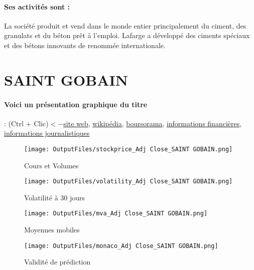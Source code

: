 \documentclass[11pt,a4paper]{report}%
\begin{document}
\paragraph{Ses activités sont : } La société produit et vend dans le monde entier principalement du ciment, des granulats et du béton prêt à l'emploi. Lafarge a développé des ciments spéciaux et des bétons innovants de renommée internationale.  
    
    \newpage

\section{SAINT GOBAIN}

\paragraph{Voici un présentation graphique du titre} : (Ctrl + Clic)$<-$\href{https://www.saint-gobain.com/fr/finance}{site web}, \href{https://fr.wikipedia.org/wiki/Saint-Gobain}{wikipédia}, \href{https://www.boursorama.com/cours/1rPSGO}{boursorama}, \href{https://www.qwant.com/?q=site:https:%2f%2fwww.easybourse.com%2faction-societe%2fSAINT-GOBAIN&t=web&client=ext-firefox-hp}{informations financières}, \href{https://bourse.lerevenu.com/cours-de-bourse/fiche-valeur-synthese/SAINT-GOBAIN/SGO-FR}{informations journalistiques}
\begin{figure}[!htb]
   \begin{minipage}{0.5\textwidth}
     \centering
     \texttt{[image: OutputFiles/stockprice\_Adj Close\_SAINT GOBAIN.png]}
     \caption{Cours et Volumes}\label{Fig:price_SAINT GOBAIN}
   \end{minipage}\hfill
   \begin{minipage}{0.5\textwidth}
     \centering
     \texttt{[image: OutputFiles/volatility\_Adj Close\_SAINT GOBAIN.png]}
     \caption{Volatilité à 30 jours}\label{Fig:volat_SAINT GOBAIN}
   \end{minipage}
\end{figure}
\begin{figure}[!htb]
   \begin{minipage}{0.5\textwidth}
     \centering
     \texttt{[image: OutputFiles/mva\_Adj Close\_SAINT GOBAIN.png]}
     \caption{Moyennes mobiles}\label{Fig:mva_SAINT GOBAIN}
   \end{minipage}\hfill
   \begin{minipage}{0.5\textwidth}
     \centering
     \texttt{[image: OutputFiles/monaco\_Adj Close\_SAINT GOBAIN.png]}
     \caption{Validité de prédiction}\label{Fig:prediction_SAINT GOBAIN}
   \end{minipage}
\end{figure}
\end{document}
